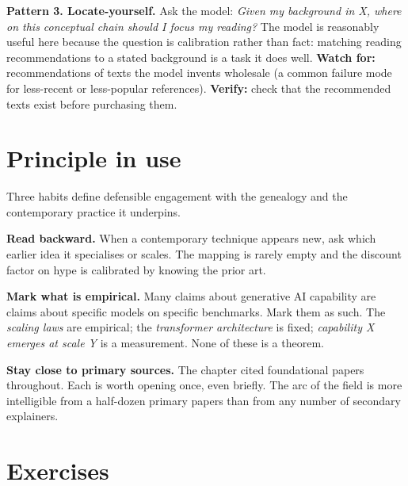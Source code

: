 \documentclass[
  letterpaper,
  11pt]{scrbook}
\begin{document}
\textbf{Pattern 3. Locate-yourself.} Ask the model: \emph{Given my
background in X, where on this conceptual chain should I focus my
reading?} The model is reasonably useful here because the question is
calibration rather than fact: matching reading recommendations to a
stated background is a task it does well. \textbf{Watch for:}
recommendations of texts the model invents wholesale (a common failure
mode for less-recent or less-popular references). \textbf{Verify:} check
that the recommended texts exist before purchasing them.

\section{Principle in use}\label{principle-in-use}

Three habits define defensible engagement with the genealogy and the
contemporary practice it underpins.

\textbf{Read backward.} When a contemporary technique appears new, ask
which earlier idea it specialises or scales. The mapping is rarely empty
and the discount factor on hype is calibrated by knowing the prior art.

\textbf{Mark what is empirical.} Many claims about generative AI
capability are claims about specific models on specific benchmarks. Mark
them as such. The \emph{scaling laws} are empirical; the
\emph{transformer architecture} is fixed; \emph{capability X emerges at
scale Y} is a measurement. None of these is a theorem.

\textbf{Stay close to primary sources.} The chapter cited foundational
papers throughout. Each is worth opening once, even briefly. The arc of
the field is more intelligible from a half-dozen primary papers than
from any number of secondary explainers.

\section{Exercises}\label{exercises}
\end{document}
